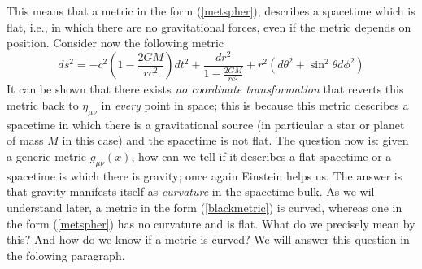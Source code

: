 \documentclass[11pt, a4paper,oneside,openright]{book}
\numberwithin{equation}{section}
\begin{document}
This means that a metric in the form (\ref{metspher}), describes a spacetime which is flat, i.e., in which there are no gravitational forces, even if the metric depends on position. Consider now the following metric
\begin{equation}
\label{blackmetric}
ds^2=-c^2\left(1-\frac{2GM}{rc^2}\right)dt^2+\frac{dr^2}{1-\frac{2GM}{rc^2}}+r^2(d\theta^2+\sin^2{\theta}d\phi^2)
\end{equation}
It can be shown that there exists \textit{no coordinate transformation} that reverts this metric back to $\eta_{\mu\nu}$ in \textit{every} point in space; this is because this metric describes a spacetime in which there is a gravitational source (in particular a star or planet of mass $M$ in this case) and the spacetime is not flat. The question now is: given a generic metric $g_{\mu\nu}(x)$, how can we tell if it describes a flat spacetime or a spacetime is which there is gravity; once again Einstein helps us. The answer is that gravity manifests itself as \textit{curvature} in the spacetime bulk. As we wil understand later, a metric in the form (\ref{blackmetric}) is curved, whereas one in the form (\ref{metspher}) has no curvature and is flat. What do we precisely mean by this? And how do we know if a metric is curved? We will answer this question in the folowing paragraph. 
\end{document}
